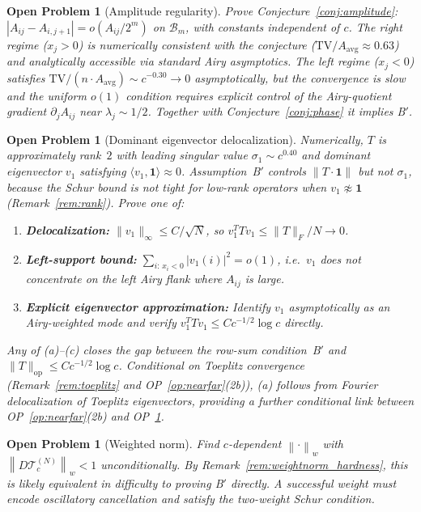 \documentclass[12pt,a4paper]{article}
\newtheorem{openproblem}[theorem]{Open Problem}
\newcommand{\norm}[1]{\left\|#1\right\|}
\begin{document}
\begin{openproblem}[Amplitude regularity]
\label{op:amplitude}
Prove Conjecture~\ref{conj:amplitude}:
$|A_{ij}-A_{i,j+1}|=o(A_{ij}/2^m)$ on $\mathcal{B}_m$,
with constants independent of $c$.
The right regime ($x_j>0$) is numerically consistent with the
conjecture ($\mathrm{TV}/A_{\mathrm{avg}}\approx 0.63$) and
analytically accessible via standard Airy asymptotics.
The left regime ($x_j<0$) satisfies
$\mathrm{TV}/(n\cdot A_{\mathrm{avg}})\sim c^{-0.30}\to 0$
asymptotically, but the convergence is slow and the uniform
$o(1)$ condition requires explicit control of the Airy-quotient
gradient $\partial_j A_{ij}$ near $\lambda_j\sim 1/2$.
Together with Conjecture~\ref{conj:phase} it implies B$'$.
\end{openproblem}

\begin{openproblem}[Dominant eigenvector delocalization]
\label{op:eigenvector}
Numerically, $T$ is approximately rank~$2$ with leading singular
value $\sigma_1\sim c^{0.40}$ and dominant eigenvector $v_1$
satisfying $\langle v_1,\mathbf{1}\rangle\approx 0$.
Assumption~B$'$ controls $\|T\cdot\mathbf{1}\|$ but not $\sigma_1$,
because the Schur bound is not tight for low-rank operators
when $v_1\not\approx\mathbf{1}$ (Remark~\ref{rem:rank}).
Prove one of:
\begin{enumerate}[nosep,label=(\alph*)]
  \item \textbf{Delocalization:}
        $\|v_1\|_\infty\leq C/\sqrt{N}$,
        so $v_1^T T v_1\leq\|T\|_F/N\to 0$.
  \item \textbf{Left-support bound:}
        $\sum_{i:\,x_i<0}|v_1(i)|^2=o(1)$,
        i.e.\ $v_1$ does not concentrate on the left Airy flank
        where $A_{ij}$ is large.
  \item \textbf{Explicit eigenvector approximation:}
        Identify $v_1$ asymptotically as an Airy-weighted mode
        and verify $v_1^T T v_1\leq Cc^{-1/2}\log c$ directly.
\end{enumerate}
Any of (a)--(c) closes the gap between the row-sum
condition~B$'$ and $\|T\|_{\mathrm{op}}\leq Cc^{-1/2}\log c$.
Conditional on Toeplitz convergence
(Remark~\ref{rem:toeplitz} and OP~\ref{op:nearfar}(2b)),
(a) follows from Fourier delocalization of Toeplitz eigenvectors,
providing a further conditional link between
OP~\ref{op:nearfar}(2b) and OP~\ref{op:eigenvector}.
\end{openproblem}

\begin{openproblem}[Weighted norm]\label{op:weightnorm}
Find $c$-dependent $\norm{\cdot}_w$ with
$\norm{D\mathcal{T}_c^{(N)}}_w<1$ unconditionally.
By Remark~\ref{rem:weightnorm_hardness}, this is likely
equivalent in difficulty to proving B$'$ directly.
A successful weight must encode oscillatory cancellation
and satisfy the two-weight Schur condition.
\end{openproblem}
\end{document}
